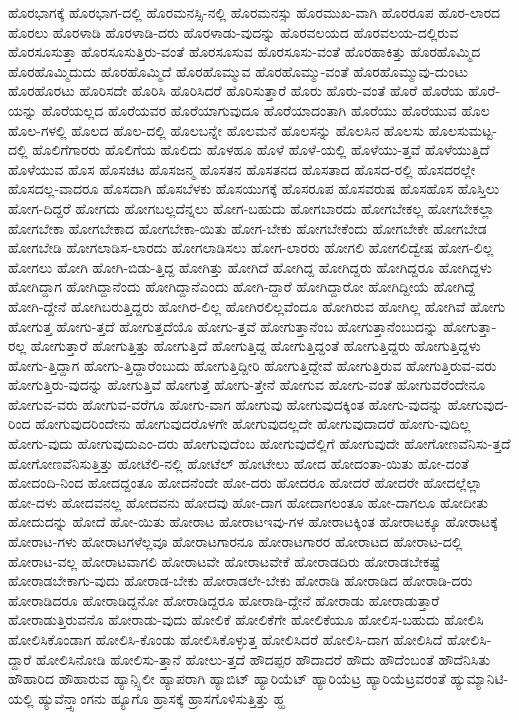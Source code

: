 {ಹೊರಭಾಗಕ್ಕೆ
ಹೊರಭಾಗ-ದಲ್ಲಿ
ಹೊರಮನಸ್ಸಿ-ನಲ್ಲಿ
ಹೊರಮನಸ್ಸು
ಹೊರಮುಖ-ವಾಗಿ
ಹೊರರೂಪ
ಹೊರ-ಲಾರದ
ಹೊರಲು
ಹೊರಳಾಡಿ
ಹೊರಳಾಡಿ-ದರು
ಹೊರಳಾಡು-ವುದನ್ನು
ಹೊರವಲಯದ
ಹೊರವಲಯ-ದಲ್ಲಿರುವ
ಹೊರಸೂಸುತ್ತಾ
ಹೊರಸೂಸುತ್ತಿರು-ವಂತೆ
ಹೊರಸೂಸುವ
ಹೊರಸೂಸು-ವಂತೆ
ಹೊರಹಾಕಿತ್ತು
ಹೊರಹೊಮ್ಮಿದ
ಹೊರಹೊಮ್ಮಿದುದು
ಹೊರಹೊಮ್ಮಿದೆ
ಹೊರಹೊಮ್ಮುವ
ಹೊರಹೊಮ್ಮು-ವಂತೆ
ಹೊರಹೊಮ್ಮುವು-ದುಂಟು
ಹೊರಹೊರಟು
ಹೊರಿಸದೇ
ಹೊರಿಸಿ
ಹೊರಿಸಿದರೆ
ಹೊರಿಸುತ್ತಾರೆ
ಹೊರು
ಹೊರು-ವಂತೆ
ಹೊರೆ
ಹೊರೆಯ
ಹೊರೆ-ಯನ್ನು
ಹೊರೆಯಲ್ಲದ
ಹೊರೆಯವರ
ಹೊರೆಯಾಗುವುದೂ
ಹೊರೆಯಾದಂತಾಗಿ
ಹೊರೆಯು
ಹೊರೆಯುವ
ಹೊಲ
ಹೊಲ-ಗಳಲ್ಲಿ
ಹೊಲದ
ಹೊಲ-ದಲ್ಲಿ
ಹೊಲಬನ್ನೇ
ಹೊಲಮನೆ
ಹೊಲಸನ್ನು
ಹೊಲಸಿನ
ಹೊಲಸು
ಹೊಲಸುಮಟ್ಟ-ದಲ್ಲಿ
ಹೊಲಿಗೆಗಾರರು
ಹೊಲಿಗೆಯ
ಹೊಲಿದು
ಹೊಳಹೂ
ಹೊಳೆ
ಹೊಳೆ-ಯಲ್ಲಿ
ಹೊಳೆಯು-ತ್ತವೆ
ಹೊಳೆಯುತ್ತಿದೆ
ಹೊಳೆಯುವ
ಹೊಸ
ಹೊಸಚಟ
ಹೊಸಜನ್ಮ
ಹೊಸತನ
ಹೊಸತನದ
ಹೊಸತಾದ
ಹೊಸದ-ರಲ್ಲಿ
ಹೊಸದರಲ್ಲೇ
ಹೊಸದಲ್ಲ-ವಾದರೂ
ಹೊಸದಾಗಿ
ಹೊಸಬೆಳಕು
ಹೊಸಯುಗಕ್ಕೆ
ಹೊಸರೂಪ
ಹೊಸವರುಷ
ಹೊಸಹೊಸ
ಹೊಸ್ತಿಲು
ಹೋಗ-ದಿದ್ದರೆ
ಹೋಗದು
ಹೋಗಬಲ್ಲದೆನ್ನಲು
ಹೋಗ-ಬಹುದು
ಹೋಗಬಾರದು
ಹೋಗಬೇಕಲ್ಲ
ಹೋಗಬೇಕಲ್ಲಾ
ಹೋಗಬೇಕಾ
ಹೋಗಬೇಕಾದ
ಹೋಗಬೇಕಾ-ಯಿತು
ಹೋಗ-ಬೇಕು
ಹೋಗಬೇಕೆಂದು
ಹೋಗಬೇಕೇ
ಹೋಗಬೇಡ
ಹೋಗಬೇಡಿ
ಹೋಗಲಾಡಿಸ-ಲಾರದು
ಹೋಗಲಾಡಿಸಲು
ಹೋಗ-ಲಾರರು
ಹೋಗಲಿ
ಹೋಗಲಿದ್ವೇಷ
ಹೋಗ-ಲಿಲ್ಲ
ಹೋಗಲು
ಹೋಗಿ
ಹೋಗಿ-ಬಿಡು-ತ್ತಿದ್ದ
ಹೋಗಿತ್ತು
ಹೋಗಿದೆ
ಹೋಗಿದ್ದ
ಹೋಗಿದ್ದರು
ಹೋಗಿದ್ದರೂ
ಹೋಗಿದ್ದಳು
ಹೋಗಿದ್ದಾಗ
ಹೋಗಿದ್ದಾನೆಂದು
ಹೋಗಿದ್ದಾನೆಎಂದು
ಹೋಗಿ-ದ್ದಾರೆ
ಹೋಗಿದ್ದಾರೋ
ಹೋಗಿದ್ದೀಯೆ
ಹೋಗಿದ್ದೆ
ಹೋಗಿ-ದ್ದೇನೆ
ಹೋಗಿಬರುತ್ತಿದ್ದರು
ಹೋಗಿರ-ಲಿಲ್ಲ
ಹೋಗಿರಲಿಲ್ಲವೆಂದೂ
ಹೋಗಿರುವ
ಹೋಗಿಲ್ಲ
ಹೋಗಿವೆ
ಹೋಗು
ಹೋಗುತ್ತ
ಹೋಗು-ತ್ತದೆ
ಹೋಗುತ್ತದೆಯೊ
ಹೋಗು-ತ್ತವೆ
ಹೋಗುತ್ತಾನೆಂಬ
ಹೋಗುತ್ತಾನೆಂಬುದನ್ನು
ಹೋಗುತ್ತಾ-ರಲ್ಲ
ಹೋಗುತ್ತಾರೆ
ಹೋಗುತ್ತಿತ್ತು
ಹೋಗುತ್ತಿದೆ
ಹೋಗುತ್ತಿದ್ದ
ಹೋಗುತ್ತಿದ್ದಂತೆ
ಹೋಗುತ್ತಿದ್ದರು
ಹೋಗುತ್ತಿದ್ದಳು
ಹೋಗು-ತ್ತಿದ್ದಾಗ
ಹೋಗು-ತ್ತಿದ್ದಾರೆಂಬುದು
ಹೋಗುತ್ತಿದ್ದೀರಿ
ಹೋಗುತ್ತಿದ್ದೇವೆ
ಹೋಗುತ್ತಿರುವ
ಹೋಗುತ್ತಿರುವ-ವರು
ಹೋಗುತ್ತಿರು-ವುದನ್ನು
ಹೋಗುತ್ತಿವೆ
ಹೋಗುತ್ತೆ
ಹೋಗು-ತ್ತೇನೆ
ಹೋಗುವ
ಹೋಗು-ವಂತೆ
ಹೋಗುವರೆಂದೇನೂ
ಹೋಗುವ-ವರು
ಹೋಗುವ-ವರೆಗೂ
ಹೋಗು-ವಾಗ
ಹೋಗುವು
ಹೋಗುವುದಕ್ಕಿಂತ
ಹೋಗು-ವುದನ್ನು
ಹೋಗುವುದ-ರಿಂದ
ಹೋಗುವುದರಿಂದೇನು
ಹೋಗುವುದರೊಳಗೇ
ಹೋಗುವುದಲ್ಲದೇ
ಹೋಗುವುದಾದರೆ
ಹೋಗು-ವುದಿಲ್ಲ
ಹೋಗು-ವುದು
ಹೋಗುವುದುಎಂ-ದರು
ಹೋಗುವುದೆಂಬ
ಹೋಗುವುದೆಲ್ಲಿಗೆ
ಹೋಗುವುದೇ
ಹೋಗೋಣವೆನಿಸು-ತ್ತದೆ
ಹೋಗೋಣವೆನಿಸುತ್ತಿತ್ತು
ಹೋಟೆಲಿ-ನಲ್ಲಿ
ಹೋಟೆಲ್
ಹೋಟೇಲು
ಹೋದ
ಹೋದಂತಾ-ಯಿತು
ಹೋ-ದಂತೆ
ಹೋದಂದಿ-ನಿಂದ
ಹೋದದ್ದಂತೂ
ಹೋದನೆಂದೇ
ಹೋ-ದರು
ಹೋದರೂ
ಹೋದರೆ
ಹೋದರೇ
ಹೋದಲ್ಲೆಲ್ಲಾ
ಹೋ-ದಳು
ಹೋದವನಲ್ಲ
ಹೋದವನು
ಹೋದವು
ಹೋ-ದಾಗ
ಹೋದಾಗಲಂತೂ
ಹೋ-ದಾಗಲೂ
ಹೋದೀತು
ಹೋದುದನ್ನು
ಹೋದೆ
ಹೋ-ಯಿತು
ಹೋರಾಟ
ಹೋರಾಟಇವು-ಗಳ
ಹೋರಾಟಕ್ಕಿಂತ
ಹೋರಾಟಕ್ಕೂ
ಹೋರಾಟಕ್ಕೆ
ಹೋರಾಟ-ಗಳು
ಹೋರಾಟಗಳೆಲ್ಲವೂ
ಹೋರಾಟಗಾರನೂ
ಹೋರಾಟಗಾರರ
ಹೋರಾಟದ
ಹೋರಾಟ-ದಲ್ಲಿ
ಹೋರಾಟ-ವಲ್ಲ
ಹೋರಾಟವಾಗಲಿ
ಹೋರಾಟವೇ
ಹೋರಾಟವೇಕೆ
ಹೋರಾಡದಿರು
ಹೋರಾಡಬೇಕಷ್ಟೆ
ಹೋರಾಡಬೇಕಾಗು-ವುದು
ಹೋರಾಡ-ಬೇಕು
ಹೋರಾಡಲೇ-ಬೇಕು
ಹೋರಾಡಿ
ಹೋರಾಡಿದ
ಹೋರಾಡಿ-ದರು
ಹೋರಾಡಿದರೂ
ಹೋರಾಡಿದ್ದನೋ
ಹೋರಾಡಿದ್ದರೂ
ಹೋರಾಡಿ-ದ್ದೇನೆ
ಹೋರಾಡು
ಹೋರಾಡುತ್ತಾರೆ
ಹೋರಾಡುತ್ತಿರುವನೊ
ಹೋರಾಡು-ವುದು
ಹೋಲಿಕೆ
ಹೋಲಿಕೆಗೇ
ಹೋಲಿಕೆಯೂ
ಹೋಲಿಸ-ಬಹುದು
ಹೋಲಿಸಿ
ಹೋಲಿಸಿಕೊಂಡಾಗ
ಹೋಲಿಸಿ-ಕೊಂಡು
ಹೋಲಿಸಿಕೊಳ್ಳುತ್ತ
ಹೋಲಿಸಿದರೆ
ಹೋಲಿಸಿ-ದಾಗ
ಹೋಲಿಸಿದೆ
ಹೋಲಿಸಿ-ದ್ದಾರೆ
ಹೋಲಿಸಿನೋಡಿ
ಹೋಲಿಸು-ತ್ತಾನೆ
ಹೋಲು-ತ್ತದೆ
ಹೌದಪ್ಪರ
ಹೌದಾದರೆ
ಹೌದು
ಹೌದೆಂಬಂತೆ
ಹೌದೆನಿಸಿತು
ಹೌಹಾರಿದ
ಹೌಹಾರುವ
ಹ್ಯಾನ್ಸ್ಸಿಲೀ
ಹ್ಯಾಪರಾಗಿ
ಹ್ಯಾಬಿಟ್
ಹ್ಯಾರಿಯೆಟ್
ಹ್ಯಾರಿಯೆಟ್ರ
ಹ್ಯಾರಿಯೆಟ್ರವರಂತೆ
ಹ್ಯುಮ್ಯಾನಿಟಿ-ಯಲ್ಲಿ
ಹ್ಯುವೆನ್ತ್ಸಾಂಗನು
ಹ್ಯೂಗೊ
ಹ್ರಾಸಕ್ಕೆ
ಹ್ರಾಸಗೊಳಿಸುತ್ತಿತ್ತು
ಹ್ಹ
}
